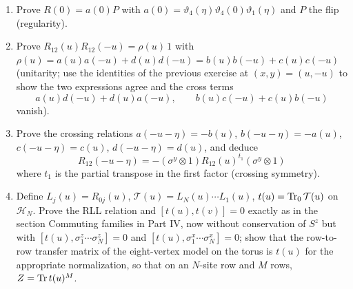 \begin{exercise}
\leavevmode\par
\begin{enumerate}[label=(\alph*)]
\item Prove $R(0)=a(0)P$ with $a(0)=\vartheta_4(\eta)\vartheta_4(0)\vartheta_1(\eta)$
and $P$ the flip (regularity).
\item Prove $R_{12}(u)R_{12}(-u)=\rho(u)\,1$ with
$\rho(u)=a(u)a(-u)+d(u)d(-u)=b(u)b(-u)+c(u)c(-u)$ (unitarity; use the
identities of the previous exercise at $(x,y)=(u,-u)$ to show the two
expressions agree and the cross terms
\[
 a(u)d(-u)+d(u)a(-u),\qquad b(u)c(-u)+c(u)b(-u)
\]
vanish).
\item Prove the crossing relations $a(-u-\eta)=-b(u)$, $b(-u-\eta)=-a(u)$,
$c(-u-\eta)=c(u)$, $d(-u-\eta)=d(u)$, and deduce
\[
 R_{12}(-u-\eta)=-(\sigma^y\otimes1)R_{12}(u)^{t_1}
                            (\sigma^y\otimes1)
\]
where $t_1$ is the partial transpose in the first factor (crossing symmetry).
\item Define $L_j(u)=R_{0j}(u)$, $\mathcal T(u)=L_N(u)\cdots L_1(u)$,
$t(u)=\operatorname{Tr}_0\mathcal T(u)$ on $\mathcal H_N$.  Prove the RLL relation and
$[t(u),t(v)]=0$ exactly as in the section Commuting families in Part IV,
now without conservation of $S^z$ but with $[t(u),\sigma^z_1\cdots\sigma^z_N]=0$
and $[t(u),\sigma^x_1\cdots\sigma^x_N]=0$; show that the row-to-row
transfer matrix of the eight-vertex model on the torus is $t(u)$ for the
appropriate normalization, so that on an $N$-site row and $M$ rows, $Z=\operatorname{Tr} t(u)^M$.
\end{enumerate}
\end{exercise}

